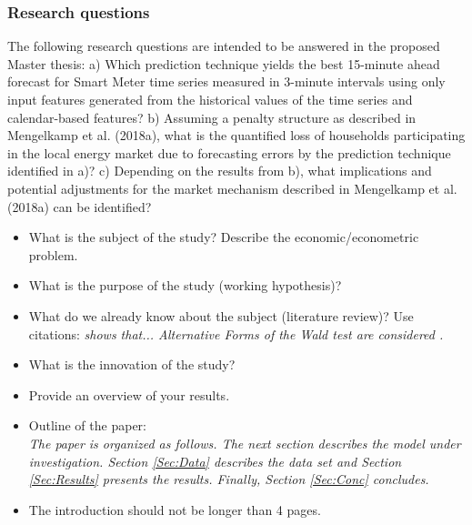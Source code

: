 \subsubsection{Research questions}
The following research questions are intended to be answered in the proposed Master thesis:
a)	Which prediction technique yields the best 15-minute ahead forecast  for Smart Meter time series measured in 3-minute intervals using only input features generated from the historical values of the time series and calendar-based features?
b)	Assuming a penalty structure as described in Mengelkamp et al. (2018a), what is the quantified loss of households participating in the local energy market due to forecasting errors by the prediction technique identified in a)?
c)	Depending on the results from b), what implications and potential adjustments for the market mechanism described in Mengelkamp et al. (2018a) can be identified?




\begin{itemize}

    \item What is the subject of the study? Describe the
        economic/econometric problem.

    \item What is the purpose of the study (working hypothesis)?

    \item What do we already know about the subject (literature
        review)? Use citations: {\it \cite{Gallant:87} shows that...
        Alternative Forms of the Wald test are considered
        \cite{Breusch&Schmidt:88}.}

    \item What is the innovation of the study?

    \item Provide an overview of your results.


    \item Outline of the paper:\\
        {\it The paper is organized as follows. The next section describes the
        model under investigation. Section \ref{Sec:Data} describes the data set
        and Section \ref{Sec:Results} presents the results. Finally, Section
        \ref{Sec:Conc} concludes.}

    \item The introduction should not be longer than 4 pages.

\end{itemize}
